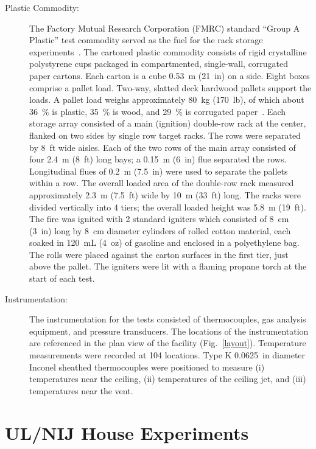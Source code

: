 \begin{description}
\item[Plastic Commodity:] The Factory Mutual Research Corporation (FMRC) standard ``Group A Plastic'' test commodity served as the fuel for the rack storage experiments~\cite{Troup:1}. The cartoned plastic commodity consists of rigid crystalline polystyrene cups packaged in compartmented, single-wall, corrugated paper cartons. Each carton is a cube 0.53~m (21~in) on a side. Eight boxes comprise a pallet load. Two-way, slatted deck hardwood pallets support the loads.  A pallet load weighs approximately 80~kg (170~lb), of which about 36~\% is plastic, 35~\% is wood, and 29~\% is corrugated paper~\cite{Troup:1}. Each storage array consisted of a main (ignition) double-row rack at the center, flanked on two sides by single row target racks. The rows were separated by 8~ft wide aisles.  Each of the two rows of the main array consisted of four 2.4~m (8~ft) long bays; a 0.15~m (6~in) flue separated the rows. Longitudinal flues of 0.2~m (7.5~in) were used to separate the pallets within a row. The overall loaded area of the double-row rack measured approximately 2.3~m (7.5~ft) wide by 10~m (33~ft) long.  The racks were divided vertically into 4 tiers; the overall loaded height was 5.8~m (19~ft). The fire was ignited with 2 standard igniters which consisted of 8~cm (3~in) long by 8~cm diameter cylinders of rolled cotton material, each soaked in 120~mL (4~oz) of gasoline and enclosed in a polyethylene bag.  The rolls were placed against the carton surfaces in the first tier, just above the pallet. The igniters were lit with a flaming propane torch at the start of each test.
\item[Instrumentation:] The instrumentation for the tests consisted of thermocouples, gas analysis equipment, and pressure transducers. The locations of the instrumentation are referenced in the plan view of the facility (Fig.~\ref{layout}). Temperature measurements were recorded at 104 locations. Type K 0.0625~in diameter Inconel sheathed thermocouples were positioned to measure (i) temperatures near the ceiling, (ii) temperatures of the ceiling jet, and (iii) temperatures near the vent.
\end{description}


\FloatBarrier


\section{UL/NIJ House Experiments}
\label{UL_NIJ_Description}

